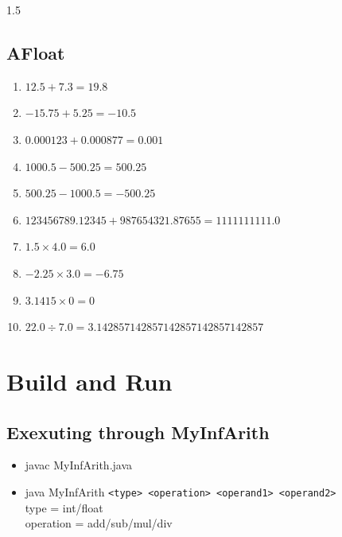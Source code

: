 \documentclass{article}
\begin{document}
\begin{spacing}{1.5}
{ \subsection{AFloat}
 \begin{enumerate}
    \item \( 12.5 + 7.3 = 19.8 \)
    \item \( -15.75 + 5.25 = -10.5 \)
    \item \( 0.000123 + 0.000877 = 0.001 \)
    \item \( 1000.5 - 500.25 = 500.25 \)
    \item \( 500.25 - 1000.5 = -500.25 \)
    \item \( 123456789.12345 + 987654321.87655 = 1111111111.0 \)
    \item \( 1.5 \times 4.0 = 6.0 \)
    \item \( -2.25 \times 3.0 = -6.75 \)
    \item \( 3.1415 \times 0 = 0 \)
    \item \( 22.0 \div 7.0 = 3.142857142857142857142857142857 \) 
\end{enumerate}

\section{Build and Run}
\subsection{Exexuting through MyInfArith}
\begin{itemize}
    \item javac MyInfArith.java
    \item java MyInfArith \texttt{<type> <operation> <operand1> <operand2>}\\
    type  = int/float\\
    operation = add/sub/mul/div
\end{itemize}
}
\end{spacing}
\end{document}
